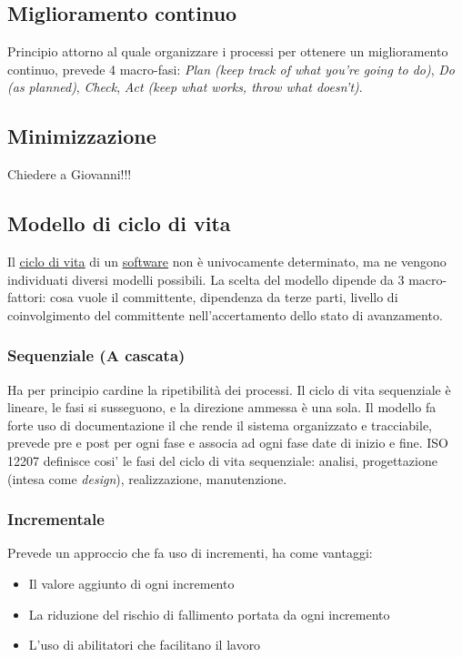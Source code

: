 	\subsection{Miglioramento continuo}
	\label{sec:miglioramentocontinuo}
	Principio attorno al quale organizzare i processi per ottenere un miglioramento continuo, prevede 4 macro-fasi:
	\emph{Plan (keep track of what you're going to do)}, \emph{Do (as planned)}, \emph{Check}, \emph{Act (keep what works, throw what doesn't)}.
	
	\subsection{Minimizzazione}
	Chiedere a Giovanni!!!
		
	\subsection{Modello di ciclo di vita}
	\label{sec:modelliciclodivita}
	Il \underline{\hyperref[sec:ciclodivita]{ciclo di vita}} di un \underline{\hyperref[sec:prodottosoftware]{software}} non è univocamente determinato, ma ne vengono individuati diversi modelli possibili. La scelta del modello dipende da 3 macro-fattori: cosa vuole il committente, dipendenza da terze parti, livello di coinvolgimento del committente nell'accertamento dello stato di avanzamento.
	
		\subsubsection{Sequenziale (A cascata)}
			Ha per principio cardine la ripetibilità dei processi.
			Il ciclo di vita sequenziale è lineare, le fasi si susseguono, e la direzione
			ammessa è una sola.
			Il modello fa forte uso di documentazione il che rende il sistema organizzato e tracciabile, prevede pre e post per ogni fase e associa ad ogni fase date di inizio e fine.  
ISO 12207 definisce cosi' le fasi del ciclo di vita sequenziale: analisi, progettazione (intesa come \textit{design}), realizzazione, manutenzione. 		
		
		\subsubsection{Incrementale}
			Prevede un approccio che fa uso di incrementi, ha come vantaggi:
			\begin{itemize}  
			\item Il valore aggiunto di ogni incremento 
			\item La riduzione del rischio di fallimento portata da ogni incremento
			\item L'uso di abilitatori che facilitano il lavoro 
			\end{itemize}			
			
